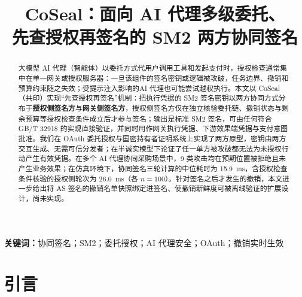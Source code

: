 \documentclass[UTF8,zihao=-4,a4paper]{ctexart}
\title{CoSeal：面向 AI 代理多级委托、\\先查授权再签名的 SM2 两方协同签名}
\author{\fillme{作者与单位；若复赛要求匿名则删去}}
\date{}
\newif\ifshowguide
\newcommand{\guide}[1]{%
  \ifshowguide
  \begin{tcolorbox}[colback=gray!8,colframe=gray!45,boxrule=0.4pt,
      arc=1pt,left=4pt,right=4pt,top=2pt,bottom=2pt,fontupper=\small]
  \textbf{写作指引：}#1
  \end{tcolorbox}
  \fi}
\theoremstyle{plain}
\theoremstyle{definition}
\theoremstyle{remark}
\begin{document}
\maketitle

\guide{标题的两个备选：（1）当前标题；（2）“基于授权检查条件协同 SM2 签名的AI 代理委托执行与支付授权”。标题应与已实现的 $n=2$ 协同签名范围一致。}

\begin{abstract}
\guide{摘要按“问题—方法—实现—结果—边界”写。下面已按实测结果写好初稿，C 可以润色，但数字不能改，除非重新测量。“实现了”只用于已实现部分；撤销名单快照只能写成“设计”。}

大模型 AI 代理（智能体）以委托方式代用户调用工具和发起支付时，授权检查通常集中在单一网关或授权服务器：一旦该组件的签名密钥或逻辑被攻破，任务边界、撤销和预算约束随之失效；受提示注入影响的AI 代理也可能尝试越权执行。本文以 CoSeal（共印）实现“先查授权再签名”机制：把执行凭据的 SM2 签名密钥以两方协同方式分布于\textbf{授权侧签名方}与\textbf{网关侧签名方}，授权侧签名方仅在独立核验委托链、撤销状态与剩余预算等授权检查条件成立后才参与签名；输出是标准 SM2 签名，可由任何符合 GB/T 32918 的实现直接验证，并同时用作网关执行凭据、下游效果端凭据与支付意图批准。我们在 OAuth 委托授权与国密持有者证明系统上实现了两方原型，密钥由两方交互生成、无需可信分发者；在半诚实模型下论证了任一单方被攻破都无法为未授权行动产生有效凭据。在多个 AI 代理协同采购场景中，9 类攻击均在预期位置被拒绝且未产生业务效果；在仿真环境下，协同签名三轮计算的中位耗时为 15.9~ms，含授权检查条件核验的授权侧轮次为 26.0~ms（各 $n=100$）。针对签名之后才发生的撤销，本文进一步给出将 AS 签名的撤销名单快照绑定进签名、使撤销新鲜度可被离线验证的扩展设计，尚未实现。
\end{abstract}

\noindent\textbf{关键词：}协同签名；SM2；委托授权；AI 代理安全；OAuth；撤销实时生效

\section{引言}\label{sec:intro}

\guide{共 5 段。第 1 段讲一个具体例子，不讲技术名词；第 2 段讲两个风险；第 3 段讲现有标准和研究已经解决了什么、还缺什么；第 4 段讲本文思路（一句话主张）；最后列贡献。全篇只围绕两条主线：AI 代理越权，以及单点被攻破。预算、恢复、审计在\cref{sec:base}作为基础机制介绍，不要在引言里展开。}
\end{document}

